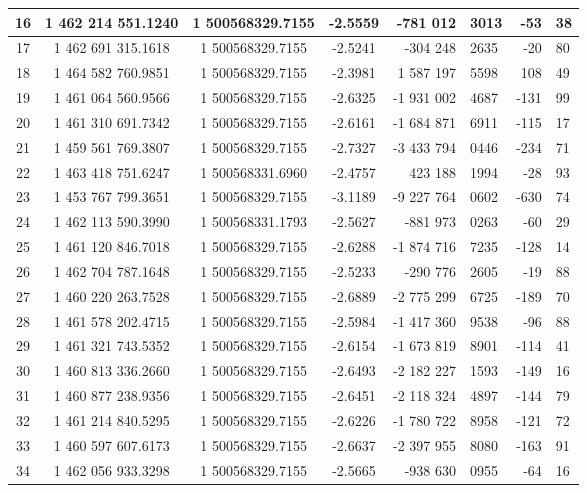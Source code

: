 \begin{center}
\begin{longtable}{|c|c|c|c|r@{.}l|r@{.}l|}
16  &     1 462 214 551.1240   &    1 500568329.7155   &      -2.5559  &         -781 012 & 3013   &   -53 & 38 \\ \hline
17  &     1 462 691 315.1618   &    1 500568329.7155   &      -2.5241  &         -304 248 & 2635   &   -20 & 80 \\ \hline
18  &     1 464 582 760.9851   &    1 500568329.7155   &      -2.3981  &        1 587 197 & 5598   &   108 & 49 \\ \hline
19  &     1 461 064 560.9566   &    1 500568329.7155   &      -2.6325  &       -1 931 002 & 4687   &  -131 & 99 \\ \hline
20  &     1 461 310 691.7342   &    1 500568329.7155   &      -2.6161  &       -1 684 871 & 6911   &  -115 & 17 \\ \hline
21  &     1 459 561 769.3807   &    1 500568329.7155   &      -2.7327  &       -3 433 794 & 0446   &  -234 & 71 \\ \hline
22  &     1 463 418 751.6247   &    1 500568331.6960   &      -2.4757  &          423 188 & 1994   &   -28 & 93 \\ \hline
23  &     1 453 767 799.3651   &    1 500568329.7155   &      -3.1189  &       -9 227 764 & 0602   &  -630 & 74 \\ \hline
24  &     1 462 113 590.3990   &    1 500568331.1793   &      -2.5627  &         -881 973 & 0263   &   -60 & 29 \\ \hline
25  &     1 461 120 846.7018   &    1 500568329.7155   &      -2.6288  &       -1 874 716 & 7235   &  -128 & 14 \\ \hline
26  &     1 462 704 787.1648   &    1 500568329.7155   &      -2.5233  &         -290 776 & 2605   &   -19 & 88 \\ \hline
27  &     1 460 220 263.7528   &    1 500568329.7155   &      -2.6889  &       -2 775 299 & 6725   &  -189 & 70 \\ \hline
28  &     1 461 578 202.4715   &    1 500568329.7155   &      -2.5984  &       -1 417 360 & 9538   &   -96 & 88 \\ \hline
29  &     1 461 321 743.5352   &    1 500568329.7155   &      -2.6154  &       -1 673 819 & 8901   &  -114 & 41 \\ \hline
30  &     1 460 813 336.2660   &    1 500568329.7155   &      -2.6493  &       -2 182 227 & 1593   &  -149 & 16 \\ \hline
31  &     1 460 877 238.9356   &    1 500568329.7155   &      -2.6451  &       -2 118 324 & 4897   &  -144 & 79 \\ \hline
32  &     1 461 214 840.5295   &    1 500568329.7155   &      -2.6226  &       -1 780 722 & 8958   &  -121 & 72 \\ \hline
33  &     1 460 597 607.6173   &    1 500568329.7155   &      -2.6637  &       -2 397 955 & 8080   &  -163 & 91 \\ \hline
34  &     1 462 056 933.3298   &    1 500568329.7155   &      -2.5665  &         -938 630 & 0955   &   -64 & 16 \\ \hline
\end{longtable}
\end{center}




